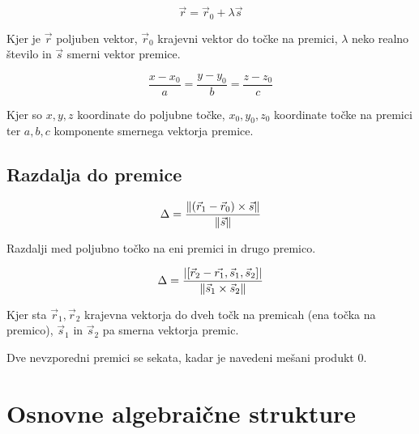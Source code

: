 
\[
	\vec{r} = \vec{r}_0 + \lambda \vec{s}
\]

Kjer je $\vec{r}$ poljuben vektor, $\vec{r}_0$ krajevni vektor do točke na premici, $\lambda$ neko realno število in $\vec{s}$ smerni vektor premice.

\[
	\frac{x-x_0}{a} = \frac{y-y_0}{b} = \frac{z-z_0}{c}
\]

Kjer so $x, y, z$ koordinate do poljubne točke, $x_0, y_0, z_0$ koordinate točke na premici ter $a, b, c$ komponente smernega vektorja premice.

\subsection{Razdalja do premice}


\[
	\Delta = \frac{\| (\vec{r}_1 - \vec{r}_0) \times \vec{s} \|}{\| \vec{s} \|}
\]


Razdalji med poljubno točko na eni premici in drugo premico.


\[
	\Delta = \frac{\left|[\vec{r}_2 - \vec{r_1}, \vec{s}_1, \vec{s}_2]\right|}{\| \vec{s}_1 \times \vec{s}_2 \|}
\]

Kjer sta $\vec{r}_1, \vec{r}_2$ krajevna vektorja do dveh točk na premicah (ena točka na premico), $\vec{s}_1$ in $\vec{s}_2$ pa smerna vektorja premic.

Dve nevzporedni premici se sekata, kadar je navedeni mešani produkt $0$.

\section{Osnovne algebraične strukture}